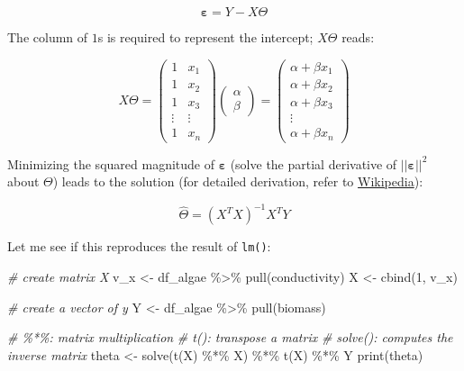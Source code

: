 \documentclass[
]{book}
\newenvironment{Shaded}{\begin{snugshade}}{\end{snugshade}}
\newcommand{\CommentTok}[1]{\textcolor[rgb]{0.56,0.35,0.01}{\textit{#1}}}
\newcommand{\DecValTok}[1]{\textcolor[rgb]{0.00,0.00,0.81}{#1}}
\newcommand{\FunctionTok}[1]{\textcolor[rgb]{0.00,0.00,0.00}{#1}}
\newcommand{\NormalTok}[1]{#1}
\newcommand{\OtherTok}[1]{\textcolor[rgb]{0.56,0.35,0.01}{#1}}
\newcommand{\SpecialCharTok}[1]{\textcolor[rgb]{0.00,0.00,0.00}{#1}}
\begin{document}
\[
\pmb{\varepsilon} = Y - X\Theta
\]

The column of \(1\)s is required to represent the intercept; \(X\Theta\) reads:

\[
X\Theta =
\begin{pmatrix} 
  1 & x_1\\ 
  1 & x_2\\
  1 & x_3\\
  \vdots & \vdots\\
  1 & x_n
\end{pmatrix}
\begin{pmatrix} 
  \alpha\\ 
  \beta
\end{pmatrix}
=
\begin{pmatrix} 
  \alpha + \beta x_1\\ 
  \alpha + \beta x_2\\
  \alpha + \beta x_3\\
  \vdots\\
  \alpha + \beta x_n
\end{pmatrix}
\]

Minimizing the squared magnitude of \(\pmb{\varepsilon}\) (solve the partial derivative of \(||\pmb{\varepsilon}||^2\) about \(\Theta\)) leads to the solution (for detailed derivation, refer to \href{https://en.wikipedia.org/wiki/Least_squares}{Wikipedia}):

\[
\hat{\Theta} = (X^TX)^{-1}X^{T}Y
\]

Let me see if this reproduces the result of \texttt{lm()}:

\begin{Shaded}
\begin{Highlighting}[]
\CommentTok{\# create matrix X}
\NormalTok{v\_x }\OtherTok{\textless{}{-}}\NormalTok{ df\_algae }\SpecialCharTok{\%\textgreater{}\%} \FunctionTok{pull}\NormalTok{(conductivity)}
\NormalTok{X }\OtherTok{\textless{}{-}} \FunctionTok{cbind}\NormalTok{(}\DecValTok{1}\NormalTok{, v\_x)}

\CommentTok{\# create a vector of y}
\NormalTok{Y }\OtherTok{\textless{}{-}}\NormalTok{ df\_algae }\SpecialCharTok{\%\textgreater{}\%} \FunctionTok{pull}\NormalTok{(biomass)}

\CommentTok{\# \%*\%: matrix multiplication}
\CommentTok{\# t(): transpose a matrix}
\CommentTok{\# solve(): computes the inverse matrix}
\NormalTok{theta }\OtherTok{\textless{}{-}} \FunctionTok{solve}\NormalTok{(}\FunctionTok{t}\NormalTok{(X) }\SpecialCharTok{\%*\%}\NormalTok{ X) }\SpecialCharTok{\%*\%} \FunctionTok{t}\NormalTok{(X) }\SpecialCharTok{\%*\%}\NormalTok{ Y}
\FunctionTok{print}\NormalTok{(theta)}
\end{Highlighting}
\end{Shaded}
\end{document}
